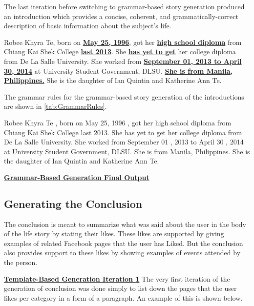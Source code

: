 The last iteration before switching to grammar-based story generation produced an introduction which provides a concise, coherent, and grammatically-correct description of basic information about the subject's life.

\begin{center} Robee Khyra Te, born on \underline{\textbf{May 25, 1996}}, got her \underline{\textbf{high school diploma}} from Chiang Kai Shek College \underline{\textbf{last 2013}}. She \underline{\textbf{has yet to get}} her college diploma from De La Salle University. She worked from \underline{\textbf{September 01, 2013 to April 30, 2014}} at University Student Government, DLSU. \underline{\textbf{She is from Manila, Philippines.}} She is the daughter of Ian Quintin and Katherine Ann Te. \end{center}

The grammar rules for the grammar-based story generation of the introductions are shown in \ref{tab:GrammarRules}.

\begin{center} Robee Khyra Te , born on May 25, 1996 , got her high school diploma from Chiang Kai Shek College last 2013. She has yet to get her college diploma from De La Salle University. She worked from September 01 , 2013 to April 30 , 2014 at University Student Government, DLSU. She is from Manila, Philippines. She is the daughter of Ian Quintin and Katherine Ann Te.
\end{center}

\underline{\textbf{Grammar-Based Generation Final Output}} \newline

\subsection{Generating the Conclusion}
The conclusion is meant to summarize what was said about the user in the body of the life story by stating their likes. These likes are supported by giving examples of related Facebook pages that the user has Liked. But the conclusion also provides support to these likes by showing examples of events attended by the person.

\underline{\textbf{Template-Based Generation Iteration 1}} \newline
The very first iteration of the generation of conclusion was done simply to list down the pages that the user likes per category in a form of a paragraph. An example of this is shown below.

